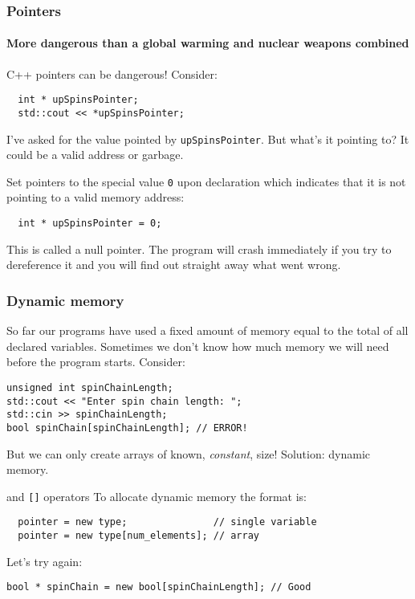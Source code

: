 \documentclass{beamer}
\begin{document}
\begin{frame}[fragile]
  \frametitle{Pointers}
  \framesubtitle{More dangerous than a global warming and nuclear weapons combined}
  \begin{warnblocke}
    C++ pointers can be dangerous!  Consider:
    \begin{lstlisting}
  int * upSpinsPointer;
  std::cout << *upSpinsPointer;
    \end{lstlisting}
    I've asked for the value pointed by \texttt{upSpinsPointer}.  But what's it pointing to?  It could be a valid address or garbage.
  \end{warnblocke}
  \pause
  \begin{doblocke}
    Set pointers to the special value \texttt{0} upon declaration which indicates that it is not pointing to a valid memory address:
    \begin{lstlisting}
  int * upSpinsPointer = 0;
    \end{lstlisting}
    This is called a null pointer.  The program will crash immediately if you try to dereference it and you will find out straight away what went wrong.
  \end{doblocke}

\end{frame}

\begin{frame}[fragile]
  \frametitle{Dynamic memory}
  So far our programs have used a fixed amount of memory equal to the total of all declared variables.  Sometimes we don't know how much memory we will need before the program starts.
  \pause
  Consider:
  \begin{lstlisting}
unsigned int spinChainLength;
std::cout << "Enter spin chain length: ";
std::cin >> spinChainLength;
bool spinChain[spinChainLength]; // ERROR!
  \end{lstlisting}
  But we can only create arrays of known, \textit{constant}, size!
  \newline\pause
  Solution: dynamic memory.
  \begin{block}{ and \texttt{[]} operators}
	  To allocate dynamic memory the format is:
	  \begin{lstlisting}
  pointer = new type;               // single variable
  pointer = new type[num_elements]; // array
	  \end{lstlisting}
  \end{block}
  \pause
  Let's try again:
  \begin{lstlisting}
bool * spinChain = new bool[spinChainLength]; // Good
  \end{lstlisting}
\end{frame}
\end{document}
